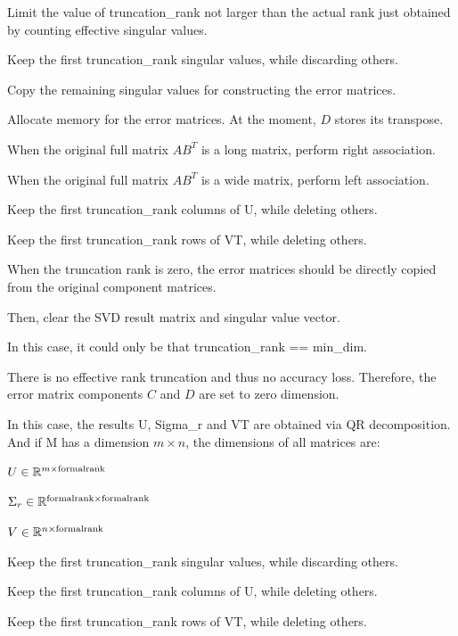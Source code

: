 Limit the value of {\ttfamily truncation\+\_\+rank} not larger than the actual rank just obtained by counting effective singular values.

Keep the first {\ttfamily truncation\+\_\+rank} singular values, while discarding others.

Copy the remaining singular values for constructing the error matrices.

Allocate memory for the error matrices. At the moment, $D$ stores its transpose.

When the original full matrix $AB^T$ is a long matrix, perform right association.

When the original full matrix $AB^T$ is a wide matrix, perform left association.

Keep the first {\ttfamily truncation\+\_\+rank} columns of {\ttfamily U}, while deleting others.

Keep the first {\ttfamily truncation\+\_\+rank} rows of {\ttfamily VT}, while deleting others.

When the truncation rank is zero, the error matrices should be directly copied from the original component matrices.

Then, clear the S\+VD result matrix and singular value vector.

In this case, it could only be that {\ttfamily truncation\+\_\+rank} == {\ttfamily min\+\_\+dim}.

There is no effective rank truncation and thus no accuracy loss. Therefore, the error matrix components $C$ and $D$ are set to zero dimension.

In this case, the results {\ttfamily U}, {\ttfamily Sigma\+\_\+r} and {\ttfamily VT} are obtained via QR decomposition. And if {\ttfamily M} has a dimension $m \times n$, the dimensions of all matrices are\+:
\begin{DoxyItemize}
\item $U \in \mathbb{R}^{m \times {\rm formal rank}}$
\item $\Sigma_r \in \mathbb{R}^{{\rm formal rank} \times {\rm formal rank}}$
\item $V \in \mathbb{R}^{n \times {\rm formal rank}}$
\end{DoxyItemize}

Keep the first {\ttfamily truncation\+\_\+rank} singular values, while discarding others.

Keep the first {\ttfamily truncation\+\_\+rank} columns of {\ttfamily U}, while deleting others.

Keep the first {\ttfamily truncation\+\_\+rank} rows of {\ttfamily VT}, while deleting others.

